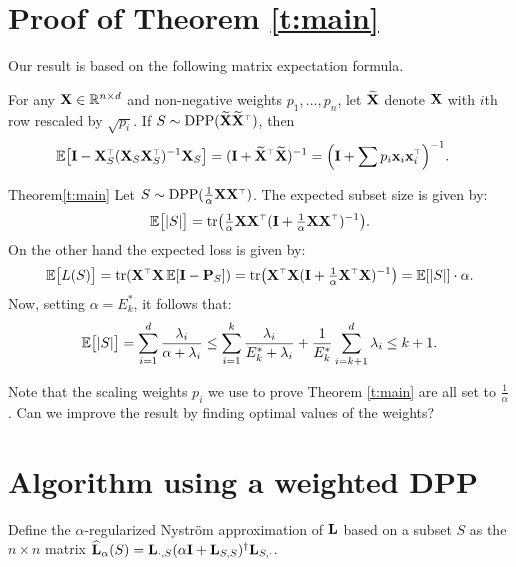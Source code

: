\documentclass[12pt]{sty/colt2019/colt2018-arxiv}
\begin{document}
\section{Proof of Theorem \ref{t:main}}
Our result is based on the following matrix expectation formula.
\begin{lemma}
  For any $\mathbf X\in\mathbb R^{n\times d}$ and non-negative weights $p_1,...,p_n$, let $\widetilde{\mathbf{X}}$ denote
  $\mathbf X$ with $i$th row rescaled by $\sqrt{p_i}$. If $S\sim\DPP(\Xt\Xt^\top)$, then
  \begin{align*}
    \E\big[\I-\X_S^\top(\X_S\X_S^\top)^{-1}\X_S\big] & = (\I +
    \Xt^\top\Xt)^{-1} = \Big(\I + \sum p_i\x_i\x_i^\top\Big)^{-1}.
  \end{align*}
\end{lemma}
\begin{proofof}{Theorem}{\ref{t:main}}
  Let $S\sim\DPP(\frac1\alpha\X\X^\top)$. The expected subset size is given by:
\begin{align*}
  \E\big[|S|\big] =
  \tr\big(\tfrac1\alpha\X\X^\top(\I+\tfrac1\alpha\X\X^\top)^{-1}\big).
\end{align*}
On the other hand the expected loss is given by:
\begin{align*}
\E\big[L(S)\big]=  
  \tr(\X^\top\X \,\E[\I-\P_S]) =
  \tr\big(\X^\top\X(\I+\tfrac1\alpha\X^\top\X)^{-1}\big) =
  \E[|S|]\cdot \alpha.
\end{align*}
Now, setting $\alpha = E_k^*$, it follows that:
\begin{align*}
  \mathbb E\big[|S|\big] = \sum_{i=1}^d\frac{\lambda_i}{\alpha+\lambda_i}\leq
  \sum_{i=1}^k\frac{\lambda_i}{E_k^*+\lambda_i} +
  \frac1{E_k^*}\sum_{i=k+1}^d\lambda_i\leq k+1.
\end{align*}
\end{proofof}

Note that the scaling weights $p_i$ we use to prove Theorem
\ref{t:main} are all set to $\frac1\alpha$. Can we improve the result
by finding optimal values of the weights? 

\section{Algorithm using a weighted DPP}

\begin{definition}
Define the $\alpha$-regularized Nystr\"om approximation of $\mathbf{L}$ based on a subset $S$
 as the $n \times n$ matrix $\widehat{\mathbf{L}}_\alpha(S)=\mathbf{L}_{\cdot,S}(\alpha\mathbf I+\mathbf{L}_{S,S})^\dagger\mathbf{L}_{S,\cdot}$.
\end{definition}
\end{document}
